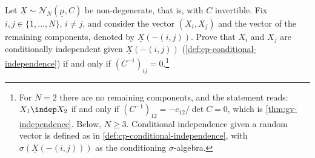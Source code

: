 \begin{example}\label{prop:gc-precision}
Let $\underline X\sim\mathcal N_N(\underline\mu,C)$ be non-degenerate, that is, with $C$ invertible. Fix $i,j\in\{1,\dots,N\}$,
$i\ne j$, and consider the vector $(X_i,X_j)$ and the vector of the remaining components, denoted by
$\underline X(-(i,j))$. Prove that $X_i$ and $X_j$ are conditionally independent given $\underline X(-(i,j))$
(\cref{def:cp-conditional-independence}) if and only if $(C^{-1})_{ij}=0$.\footnote{For $N=2$ there
are no remaining components, and the statement reads: $X_1\indep X_2$ if and only if
$(C^{-1})_{12}=-c_{12}/\det C=0$, which is \cref{thm:gv-independence}. Below, $N\ge3$. Conditional
independence given a random vector is defined as in \cref{def:cp-conditional-independence}, with
$\sigma(\underline X(-(i,j)))$ as the conditioning $\sigma$-algebra.}


\end{example}
